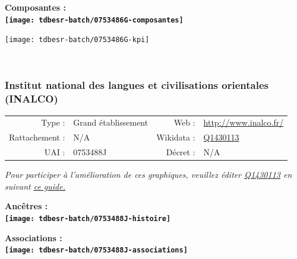 \documentclass[12pt,french,]{article}
\begin{document}
\hrulefill

\begin{center} \bf Composantes : \\  
\texttt{[image: tdbesr-batch/0753486G-composantes]} \end{center}

\begin{center}\texttt{[image: tdbesr-batch/0753486G-kpi]} \end{center}\checkoddpage

\ifoddpage \fi ~\newpage  

\hypertarget{institut-national-des-langues-et-civilisations-orientales-inalco}{%
\subsubsection{Institut national des langues et civilisations orientales
(INALCO)}\label{institut-national-des-langues-et-civilisations-orientales-inalco}}

\begin{tabular*}{\textwidth}{rp{5cm}rl}  
\hline  
Type : & Grand établissement & Web : &\href{http://www.inalco.fr/}{http://www.inalco.fr/} \\  
Rattachement : & N/A & Wikidata : & \href{https://www.wikidata.org/entity/Q1430113}{Q1430113} \\  
UAI : & 0753488J & Décret : & N/A \\  
\hline  
\end{tabular*}

\textit{\scriptsize Pour participer à l'amélioration de ces graphiques, veuillez éditer  \href{https://www.wikidata.org/entity/Q1430113}{Q1430113}  en suivant \href{https://github.com/cpesr/wikidataESR/blob/master/Rmd/wikidataESR.md}{ce guide.}}

\vspace{1cm}  
\begin{minipage}[b]{0.50\textwidth}\begin{center} \bf Ancêtres : \\  
\texttt{[image: tdbesr-batch/0753488J-histoire]} \end{center}\end{minipage}\begin{minipage}[b]{0.50\textwidth}\begin{center} \bf Associations : \\  
\texttt{[image: tdbesr-batch/0753488J-associations]} \end{center}\end{minipage}
\end{document}
